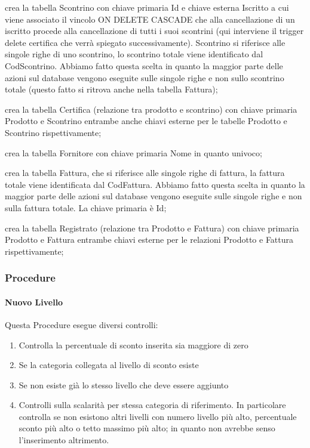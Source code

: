 
crea la tabella Scontrino con chiave primaria Id e chiave esterna Iscritto a cui viene associato il vincolo ON DELETE CASCADE che alla cancellazione di un iscritto procede alla cancellazione di tutti i suoi scontrini (qui interviene il trigger delete certifica che verr\`a spiegato successivamente). Scontrino si riferisce alle singole righe di uno scontrino, lo scontrino totale viene identificato dal CodScontrino. Abbiamo fatto questa scelta in quanto la maggior parte delle azioni sul database vengono eseguite sulle singole righe e non sullo scontrino totale (questo fatto si ritrova anche nella tabella Fattura);


crea la tabella Certifica (relazione tra prodotto e scontrino) con chiave primaria Prodotto e Scontrino entrambe anche chiavi esterne per le tabelle Prodotto e Scontrino rispettivamente;


crea la tabella Fornitore con chiave primaria Nome in quanto univoco;


crea la tabella Fattura, che si riferisce alle singole righe di fattura, la fattura totale viene identificata dal CodFattura. Abbiamo fatto questa scelta in quanto la maggior parte delle azioni sul database vengono eseguite sulle singole righe e non sulla fattura totale. La chiave primaria \`e Id;


crea la tabella Registrato (relazione tra Prodotto e Fattura) con chiave primaria Prodotto e Fattura entrambe chiavi esterne per le relazioni Prodotto e Fattura rispettivamente;


\subsubsection{Procedure}

\paragraph*{Nuovo Livello}
Questa Procedure esegue diversi controlli:
\begin{enumerate}

\item Controlla la percentuale di sconto inserita sia maggiore di zero

\item Se la categoria collegata al livello di sconto esiste

\item Se non esiste gi\`a lo stesso livello che deve essere aggiunto

\item Controlli sulla scalarit\`a per stessa categoria di riferimento. In particolare controlla se non esistono altri livelli con numero livello pi\`u alto, percentuale sconto pi\`u alto o tetto massimo pi\`u alto; in quanto non avrebbe senso l'inserimento altrimento.
\end{enumerate}


